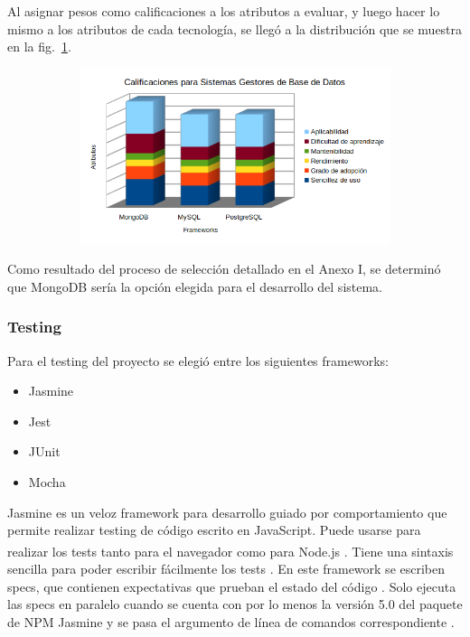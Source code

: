 \documentclass{article}
\begin{document}
Al asignar pesos como calificaciones a los atributos a evaluar, y luego hacer lo mismo a los atributos de cada tecnología, se llegó a la distribución que se muestra en la fig.~\ref{fig:dbms}.
\begin{figure}[H]
	\caption{Calificaciones para Sistemas Gestores de Base de Datos}
    \begin{subfigure}{1\textwidth}
	\includegraphics[width=1\textwidth]{calificaciones para dbms.png}
    \end{subfigure}
	\label{fig:dbms}
\end{figure}
\vspace{-1.0\baselineskip}
Como resultado del proceso de selección detallado en el Anexo I, se determinó que MongoDB sería la opción elegida para el desarrollo del sistema.
\subsubsection{Testing}
Para el testing del proyecto se elegió entre los siguientes frameworks:
\begin{itemize}
    \item Jasmine
    \item Jest
    \item JUnit
    \item Mocha
\end{itemize}
Jasmine es un veloz framework para desarrollo guiado por comportamiento que permite realizar testing de código escrito en JavaScript. Puede usarse para realizar los tests tanto para el navegador como para Node.js \textsuperscript{\textregistered}. Tiene una sintaxis sencilla para poder escribir fácilmente los tests \parencite{jasmineOfficialHome}. En este framework se escriben specs, que contienen expectativas que prueban el estado del código \parencite{jasmineYourFirstSuite}. Solo ejecuta las specs en paralelo cuando se cuenta con por lo menos la versión 5.0 del paquete de NPM Jasmine y se pasa el argumento de línea de comandos correspondiente \parencite{jasmineFrequentlyAskedQuestions}. 
\end{document}
